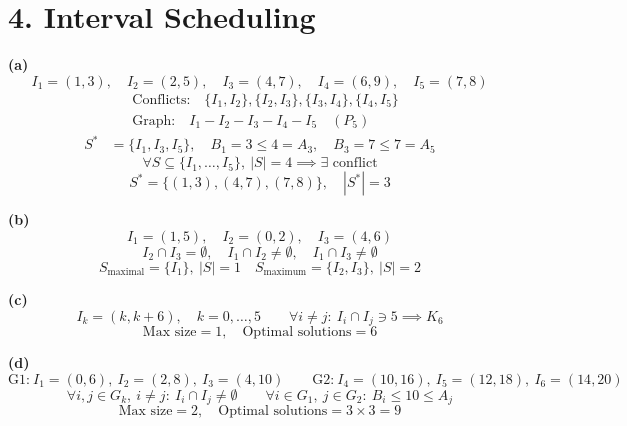 \documentclass[11pt]{article}
\begin{document}
\section*{4. Interval Scheduling}


\textbf{(a)}
\[
I_1 = (1,3), \quad I_2 = (2,5), \quad I_3 = (4,7), \quad I_4 = (6,9), \quad I_5 = (7,8)
\]
\begin{align*}
&\text{Conflicts:} \quad \{I_1, I_2\}, \{I_2, I_3\}, \{I_3, I_4\}, \{I_4, I_5\} \\
&\text{Graph:} \quad I_1 - I_2 - I_3 - I_4 - I_5 \quad (P_5)
\end{align*}
\begin{align*}
S^* &= \{I_1, I_3, I_5\}, \quad B_1 = 3 \le 4 = A_3, \quad B_3 = 7 \le 7 = A_5
\end{align*}
\[
\forall S \subseteq \{I_1, \ldots, I_5\},\ |S| = 4 \implies \exists \text{ conflict}
\]
\[
\boxed{S^* = \{(1,3), (4,7), (7,8)\}, \quad |S^*| = 3}
\]

\textbf{(b)}
\[
I_1 = (1,5), \quad I_2 = (0,2), \quad I_3 = (4,6)
\]
\[
I_2 \cap I_3 = \emptyset, \quad I_1 \cap I_2 \ne \emptyset, \quad I_1 \cap I_3 \ne \emptyset
\]
\[
\boxed{S_{\text{maximal}} = \{I_1\},\ |S| = 1 \quad S_{\text{maximum}} = \{I_2, I_3\},\ |S| = 2}
\]

\textbf{(c)}
\[
I_k = (k, k+6), \quad k = 0, \ldots, 5 \qquad \forall i \ne j:\ I_i \cap I_j \ni 5 \implies K_6
\]
\[
\boxed{\text{Max size} = 1, \quad \text{Optimal solutions} = 6}
\]

\textbf{(d)}
\[
\text{G1:}\ I_1 = (0,6),\ I_2 = (2,8),\ I_3 = (4,10) \qquad \text{G2:}\ I_4 = (10,16),\ I_5 = (12,18),\ I_6 = (14,20)
\]
\[
\forall i,j \in G_k,\ i \ne j:\ I_i \cap I_j \ne \emptyset \qquad \forall i \in G_1,\ j \in G_2:\ B_i \le 10 \le A_j
\]
\[
\boxed{\text{Max size} = 2, \quad \text{Optimal solutions} = 3 \times 3 = 9}
\]
\end{document}
